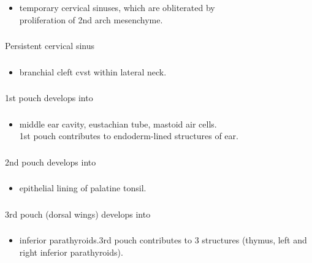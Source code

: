 \documentclass[11pt]{beamer}
\begin{document}
\begin{frame}
 \frametitle{}
\begin{itemize}
\item{temporary cervical sinuses, which are obliterated by \\ proliferation of 2nd arch mesenchyme.}
\end{itemize}
\end{frame}

\begin{frame}
 \frametitle{}
Persistent cervical sinus
\end{frame}

\begin{frame}
 \frametitle{}
\begin{itemize}
\item{ branchial cleft cvst within lateral neck.}
\end{itemize}
\end{frame}

\begin{frame}
 \frametitle{}
1st pouch develops into
\end{frame}

\begin{frame}
 \frametitle{}
\begin{itemize}
\item{middle ear cavity, eustachian tube, mastoid air cells. \\ 1st pouch contributes to endoderm-lined structures of ear.}
\end{itemize}
\end{frame}

\begin{frame}
 \frametitle{}
2nd pouch develops into
\end{frame}

\begin{frame}
 \frametitle{}
\begin{itemize}
\item{epithelial lining of palatine tonsil.}
\end{itemize}
\end{frame}

\begin{frame}
 \frametitle{}
3rd pouch (dorsal wings) develops into 
\end{frame}

\begin{frame}
 \frametitle{}
\begin{itemize}
\item{inferior parathyroids.3rd pouch contributes to 3 structures (thymus, left and right inferior parathyroids).}
\end{itemize}
\end{frame}
\end{document}
